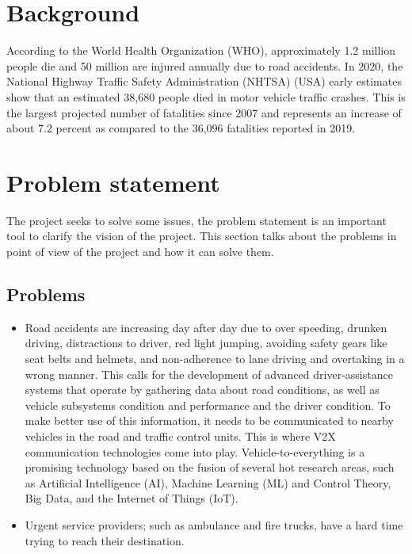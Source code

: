 \section {Background}
According to the World Health Organization (WHO), approximately 1.2 million people die and 50 million are injured annually due to road accidents. \newline \newline
In 2020, the National Highway Traffic Safety Administration (NHTSA) (USA) early estimates show that an estimated 38,680 people died in motor vehicle traffic crashes. This is the largest projected number of fatalities since 2007 and represents an increase of about 7.2 percent as compared to the 36,096 fatalities reported in 2019. \newline \newline
\section{Problem statement}
The project seeks to solve some issues, the problem statement is an important tool to clarify the vision of the project. This section talks about the problems in point of view of the project and how it can solve them.
\subsection{Problems}
\begin{itemize}
    \item Road accidents are increasing day after day due to over speeding, drunken driving, distractions to driver, red light jumping, avoiding safety gears like seat belts and helmets, and non-adherence to lane driving and overtaking in a wrong manner. This calls for the development of advanced driver-assistance systems that operate by gathering data about road conditions, as well as vehicle subsystems condition and performance and the driver condition. To make better use of this information, it needs to be communicated to nearby vehicles in the road and traffic control units. This is where V2X communication technologies come into play. Vehicle-to-everything is a promising technology based on the fusion of several hot research areas, such as Artificial Intelligence (AI), Machine Learning (ML) and Control Theory, Big Data, and the Internet of Things (IoT).
    \item Urgent service providers; such as ambulance and fire trucks, have a hard time trying to reach their destination.
\end{itemize}

